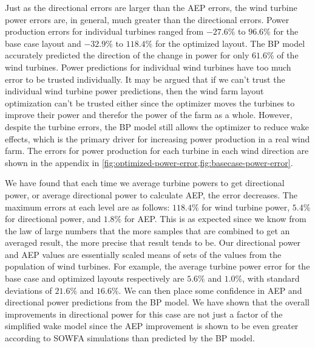 \documentclass[conf]{new-aiaa}
\begin{document}
Just as the directional errors are larger than the AEP errors, the wind turbine power errors are, in general, much greater than the directional errors. Power production errors for individual turbines ranged from $-27.6\%$ to $96.6\%$ for the base case layout and $-32.9\%$ to $118.4\%$ for the optimized layout. The BP model accurately predicted the direction of the change in power for only $61.6\%$ of the wind turbines. Power predictions for individual wind turbines have too much error to be trusted individually. It may be argued that if we can't trust the individual wind turbine power predictions, then the wind farm layout optimization can't be trusted either since the optimizer moves the turbines to improve their power and therefor the power of the farm as a whole. However, despite the turbine errors, the BP model still allows the optimizer to reduce wake effects, which is the primary driver for increasing power production in a real wind farm. The errors for power production for each turbine in each wind direction are shown in the appendix in \cref{fig:optimized-power-error,fig:basecase-power-error}.

We have found that each time we average turbine powers to get directional power, or average directional power to calculate AEP, the error decreases. The maximum errors at each level are as follows: $118.4\%$ for wind turbine power, $5.4\%$ for directional power, and $1.8\%$ for AEP. This is as expected since we know from the law of large numbers that the more samples that are combined to get an averaged result, the more precise that result tends to be. Our directional power and AEP values are essentially scaled means of sets of the values from the population of wind turbines. For example, the average turbine power error for the base case and optimized layouts respectively are $5.6\%$ and $1.0\%$, with standard deviations of $21.6\%$ and $16.6\%$. We can then place some confidence in AEP and directional power predictions from the BP model. We have shown that the overall improvements in directional power for this case are not just a factor of the simplified wake model since the AEP improvement is shown to be even greater according to SOWFA simulations than predicted by the BP model.
\end{document}
